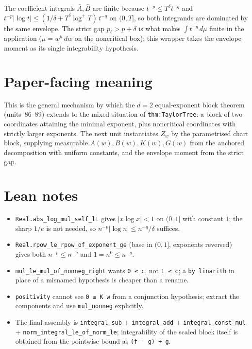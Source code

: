 \documentclass[11pt]{article}
\begin{document}
The coefficient integrals $\bar A,\bar B$ are finite because $t^{-p}\le T^\delta t^{-q}$ and
$t^{-p}|\log t|\le(1/\delta+T^\delta\log^+T)\,t^{-q}$ on $(0,T]$, so both integrands are dominated by
the same envelope. The strict gap $p_\ell>p+\delta$ is what makes $\int t^{-q}\,d\mu$ finite in the
application ($\mu=w^h\,dw$ on the noncritical box): this wrapper takes the envelope moment as its
single integrability hypothesis.

\section{Paper-facing meaning}

This is the general mechanism by which the $d=2$ equal-exponent block theorem (units~86--89)
extends to the mixed situation of \texttt{thm:TaylorTree}: a block of two coordinates attaining the
minimal exponent, plus noncritical coordinates with strictly larger exponents. The next unit
instantiates $Z_w$ by the parametrised chart block, supplying measurable $A(w),B(w),K(w),G(w)$
from the anchored decomposition with uniform constants, and the envelope moment from the strict gap.

\section{Lean notes}

\begin{itemize}
\item \texttt{Real.abs\_log\_mul\_self\_lt} gives $|x\log x|<1$ on $(0,1]$ with constant $1$; the
sharp $1/e$ is not needed, so $n^{-p}|\log n|\le n^{-q}/\delta$ suffices.
\item \texttt{Real.rpow\_le\_rpow\_of\_exponent\_ge} (base in $(0,1]$, exponents reversed) gives
both $n^{-p}\le n^{-q}$ and $1=n^0\le n^{-q}$.
\item \texttt{mul\_le\_mul\_of\_nonneg\_right} wants \texttt{0 ≤ c}, not \texttt{1 ≤ c}; a
\texttt{by linarith} in place of a misnamed hypothesis is cheaper than a rename.
\item \texttt{positivity} cannot see \texttt{0 ≤ K w} from a conjunction hypothesis; extract the
components and use \texttt{mul\_nonneg} explicitly.
\item The final assembly is \texttt{integral\_sub} + \texttt{integral\_add} +
\texttt{integral\_const\_mul} + \texttt{norm\_integral\_le\_of\_norm\_le}; integrability of the
scaled block itself is obtained from the pointwise bound as \texttt{(f - g) + g}.
\end{itemize}
\end{document}
